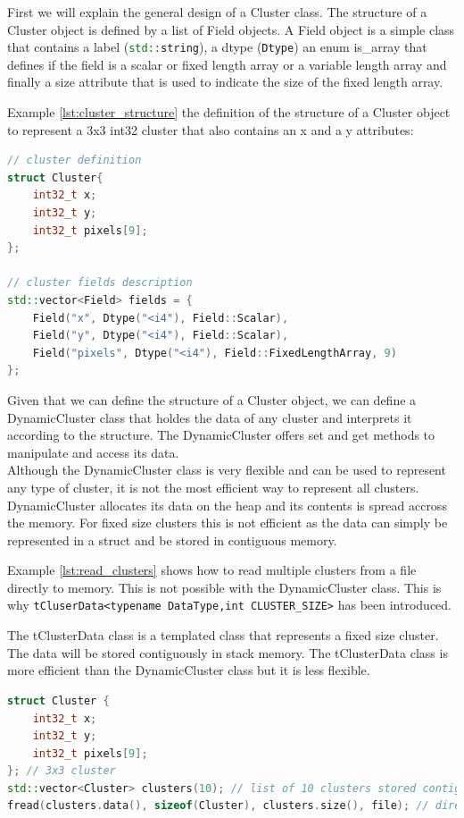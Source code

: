 \documentclass[./chapitre3.tex]{subfiles}
\begin{document}
First we will explain the general design of a Cluster class. The structure of a Cluster object is defined by a
list of Field objects. A Field object is a simple class that contains a label (\lstinline[language=C++]{std::string}), a
dtype (\lstinline[language=C++]{Dtype}) an enum is\_array that defines if the field is a scalar or fixed length array or a
variable length array and finally a size attribute that is used to indicate the size of the fixed length array.

Example \ref{lst:cluster_structure} the definition of the structure of a Cluster object to represent a 3x3 int32 cluster
that also contains an x and a y attributes:
\begin{lstlisting}[language=C++, caption={Example: Definition of a Cluster structure},label={lst:cluster_structure}]
// cluster definition
struct Cluster{
    int32_t x;
    int32_t y;
    int32_t pixels[9];
};

// cluster fields description
std::vector<Field> fields = {
    Field("x", Dtype("<i4"), Field::Scalar),
    Field("y", Dtype("<i4"), Field::Scalar),
    Field("pixels", Dtype("<i4"), Field::FixedLengthArray, 9)
};
    \end{lstlisting}

Given that we can define the structure of a Cluster object, we can define a DynamicCluster class that holdes the data of any
cluster and interprets it according to the structure. The DynamicCluster offers set and get methods to manipulate and access
its data.\\

Although the DynamicCluster class is very flexible and can be used to represent any type of cluster, it is not the most efficient
way to represent all clusters. DynamicCluster allocates its data on the heap and its contents is spread accross the memory.
For fixed size clusters this is not efficient as the data can simply be represented in a struct and be stored in contiguous
memory.

Example \ref{lst:read_clusters} shows how to read multiple clusters from a file directly to memory. This is not possible
with the DynamicCluster class. This is why \lstinline|tCluserData<typename DataType,int CLUSTER_SIZE>| has been introduced.

The tClusterData class is a templated class that represents a fixed size cluster. The data will be stored contiguously in
stack memory. The tClusterData class is more efficient than the DynamicCluster class but it is less flexible.\\
\begin{lstlisting}[language=C++, caption={Example: Reading multiple clusters from a file},label={lst:read_clusters}]
struct Cluster {
    int32_t x;
    int32_t y;
    int32_t pixels[9];
}; // 3x3 cluster
std::vector<Cluster> clusters(10); // list of 10 clusters stored contiguously in memory
fread(clusters.data(), sizeof(Cluster), clusters.size(), file); // directly read 10 Clusters to memory
    \end{lstlisting}
\end{document}
